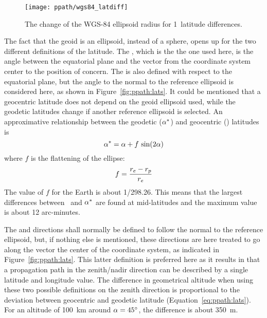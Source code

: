 \begin{figure}[!p]
 \begin{minipage}[c]{0.65\textwidth}
 \texttt{[image: ppath/wgs84\_latdiff]}
 \end{minipage}%
 \begin{minipage}[c]{0.35\textwidth}
  \caption{The change of the WGS-84 ellipsoid radius for  1\degree\ 
            latitude differences.}
  \label{fig:ppath:latdiff}
 \end{minipage}%
\end{figure}   



\label{sec:ppath:geolat}

The fact that the geoid is an ellipsoid, instead of a sphere, opens up
for the two different definitions of the latitude. The
, which is the the one used here, is the
angle between the equatorial plane and the vector from the coordinate
system center to the position of concern. The  is also defined with respect to the equatorial plane, but
the angle to the normal to the reference ellipsoid is considered here, as
shown in Figure~\ref{fig:ppath:lats}. It could be mentioned that a
geocentric latitude does not depend on the geoid ellipsoid used, while
the geodetic latitudes change if another reference ellipsoid is
selected. An approximative relationship between the geodetic
($\alpha^*$) and geocentric (\Lat) latitudes is \citep{montenbruck:00}
\begin{equation}
 \alpha^* = \alpha + f\,\sin(2\alpha)  
 \label{eq:ppath:lats}
\end{equation}
where $f$ is the flattening of the ellipse:
\begin{equation}
 f = \frac{r_{e}-r_{p}}{r_{e}}
\end{equation}
The value of $f$ for the Earth is about 1/298.26. This means that the
largest differences between \Lat\ and $\alpha^*$ are found at
mid-latitudes and the maximum value is about 12 arc-minutes.

The  and  directions shall normally be
defined to follow the normal to the reference ellipsoid, but, if
nothing else is mentioned, these directions are here treated to go
along the vector the center of the coordinate system, as indicated in
Figure~\ref{fig:ppath:lats}. This latter definition is preferred here
as it results in that a propagation path in the zenith/nadir direction
can be described by a single latitude and longitude value. The
difference in geometrical altitude when using these two possible
definitions on the zenith direction is proportional to the deviation
between geocentric and geodetic latitude (Equation~\ref{eq:ppath:lats}).
For an altitude of 100~km around $\alpha=45^\circ$, the difference is
about 350~m.


